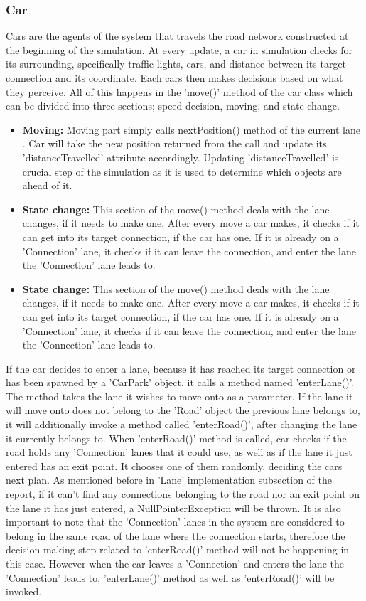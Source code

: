 \documentclass[11pt]{article}
\begin{document}
\subsubsection{Car}
Cars are the agents of the system that travels the road network constructed at the beginning of the simulation. At every update, a car in simulation checks for its surrounding, specifically traffic lights, cars, and distance between its target connection and its coordinate. Each cars then makes decisions based on what they perceive. All of this happens in the 'move()' method of the car class which can be divided into three sections; speed decision, moving, and state change.
\begin{itemize}
\item \textbf{Moving:} Moving part simply calls nextPosition()  method of the current lane . Car will take the new position returned from the call and update its 'distanceTravelled' attribute accordingly. Updating 'distanceTravelled' is crucial step of the simulation as it is used to determine which objects are ahead of it.

\item \textbf{State change:} This section of the move() method deals with the lane changes, if it needs to make one. After every move a car makes, it checks if it can get into its target connection, if the car has one. If it is already on a 'Connection' lane, it checks if it can leave the connection, and enter the lane the 'Connection' lane leads to.

\item \textbf{State change:} This section of the move() method deals with the lane changes, if it needs to make one. After every move a car makes, it checks if it can get into its target connection, if the car has one. If it is already on a 'Connection' lane, it checks if it can leave the connection, and enter the lane the 'Connection' lane leads to.
\end{itemize}

If the car decides to enter a lane, because it has reached its target connection or has been spawned by a 'CarPark' object, it calls a method named 'enterLane()'. The method takes the lane it wishes to move onto as a parameter. If the lane it will move onto does not belong to the 'Road' object the previous lane belongs to, it will additionally invoke a method called 'enterRoad()', after changing the lane it currently belongs to. When 'enterRoad()' method is called, car checks if the road holds any 'Connection' lanes that it could use, as well as if the lane it just entered has an exit point. It chooses one of them randomly, deciding the cars next plan. As mentioned before in 'Lane' implementation subsection of the report, if it can't find any connections belonging to the road nor an exit point on the lane it has just entered, a NullPointerException will be thrown. It is also important to note that the 'Connection' lanes in the system are considered to belong in the same road of the lane where the connection starts, therefore the decision making step related to 'enterRoad()' method will not be happening in this case. However when the car leaves a 'Connection' and enters the lane the 'Connection' leads to, 'enterLane()' method as well as 'enterRoad()' will be invoked.
\end{document}
